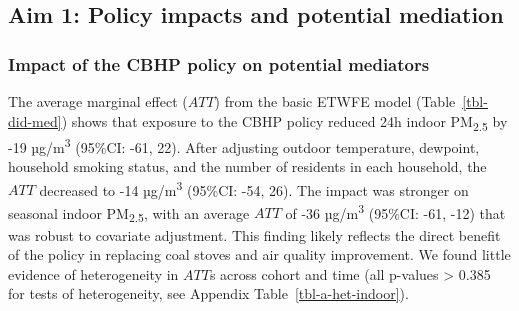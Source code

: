 \documentclass[
  letterpaper,
  DIV=11,
  numbers=noendperiod]{scrartcl}
\begin{document}
\hypertarget{aim-1-policy-impacts-and-potential-mediation}{%
\subsection{Aim 1: Policy impacts and potential
mediation}\label{aim-1-policy-impacts-and-potential-mediation}}

\hypertarget{impact-of-the-cbhp-policy-on-potential-mediators}{%
\subsubsection{Impact of the CBHP policy on potential
mediators}\label{impact-of-the-cbhp-policy-on-potential-mediators}}

The average marginal effect (\(ATT\)) from the basic ETWFE model
(Table~\ref{tbl-did-med}) shows that exposure to the CBHP policy reduced
24h indoor PM\textsubscript{2.5} by -19 µg/m\textsuperscript{3} (95\%CI:
-61, 22). After adjusting outdoor temperature, dewpoint, household
smoking status, and the number of residents in each household, the
\(ATT\) decreased to -14 µg/m\textsuperscript{3} (95\%CI: -54, 26). The
impact was stronger on seasonal indoor PM\textsubscript{2.5}, with an
average \(ATT\) of -36 µg/m\textsuperscript{3} (95\%CI: -61, -12) that
was robust to covariate adjustment. This finding likely reflects the
direct benefit of the policy in replacing coal stoves and air quality
improvement. We found little evidence of heterogeneity in \(ATT\)s
across cohort and time (all p-values \textgreater{} 0.385 for tests of
heterogeneity, see Appendix Table~\ref{tbl-a-het-indoor}).
\end{document}
